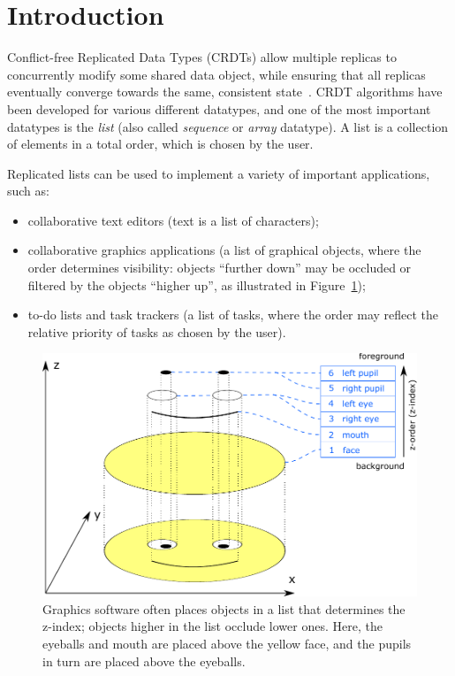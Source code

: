 \documentclass[sigplan,10pt]{acmart}
\begin{document}

\maketitle

\section{Introduction}

Conflict-free Replicated Data Types (CRDTs) allow multiple replicas to concurrently modify some shared data object, while ensuring that all replicas eventually converge towards the same, consistent state~\cite{Shapiro:2011un}.
CRDT algorithms have been developed for various different datatypes, and one of the most important datatypes is the \emph{list} (also called \emph{sequence} or \emph{array} datatype).
A list is a collection of elements in a total order, which is chosen by the user.

Replicated lists can be used to implement a variety of important applications, such as:
\begin{itemize}
    \item collaborative text editors (text is a list of characters);
    \item collaborative graphics applications (a list of graphical objects, where the order determines visibility: objects ``further down'' may be occluded or filtered by the objects ``higher up'', as illustrated in Figure~\ref{fig:smiley});
    \item to-do lists and task trackers (a list of tasks, where the order may reflect the relative priority of tasks as chosen by the user).
\end{itemize}

\begin{figure}
  \centering
  \includegraphics{smiley.pdf}
  \caption{Graphics software often places objects in a list that determines the z-index; objects higher in the list occlude lower ones. %
    Here, the eyeballs and mouth are placed above the yellow face, and the pupils in turn are placed above the eyeballs.}
  \label{fig:smiley}
\end{figure}
\end{document}
